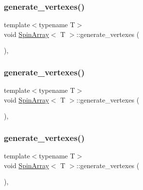 \mbox{\label{classSpinArray_a9a91cd3d27cfd626edaaafe1cf2bc679}} 
\subsubsection{\texorpdfstring{generate\+\_\+vertexes()}{generate\_vertexes()}\hspace{0.1cm}{\footnotesize\ttfamily [1/4]}}
{\footnotesize\ttfamily template$<$typename T$>$ \\
void \mbox{\hyperlink{classSpinArray}{Spin\+Array}}$<$ T $>$\+::generate\+\_\+vertexes (\begin{DoxyParamCaption}{ }\end{DoxyParamCaption})\hspace{0.3cm}{\ttfamily [inline]}, {\ttfamily [private]}}

\mbox{\label{classSpinArray_a9a91cd3d27cfd626edaaafe1cf2bc679}} 
\subsubsection{\texorpdfstring{generate\+\_\+vertexes()}{generate\_vertexes()}\hspace{0.1cm}{\footnotesize\ttfamily [2/4]}}
{\footnotesize\ttfamily template$<$typename T$>$ \\
void \mbox{\hyperlink{classSpinArray}{Spin\+Array}}$<$ T $>$\+::generate\+\_\+vertexes (\begin{DoxyParamCaption}{ }\end{DoxyParamCaption})\hspace{0.3cm}{\ttfamily [inline]}, {\ttfamily [private]}}

\mbox{\label{classSpinArray_a9a91cd3d27cfd626edaaafe1cf2bc679}} 
\subsubsection{\texorpdfstring{generate\+\_\+vertexes()}{generate\_vertexes()}\hspace{0.1cm}{\footnotesize\ttfamily [3/4]}}
{\footnotesize\ttfamily template$<$typename T$>$ \\
void \mbox{\hyperlink{classSpinArray}{Spin\+Array}}$<$ T $>$\+::generate\+\_\+vertexes (\begin{DoxyParamCaption}{ }\end{DoxyParamCaption})\hspace{0.3cm}{\ttfamily [inline]}, {\ttfamily [private]}}

